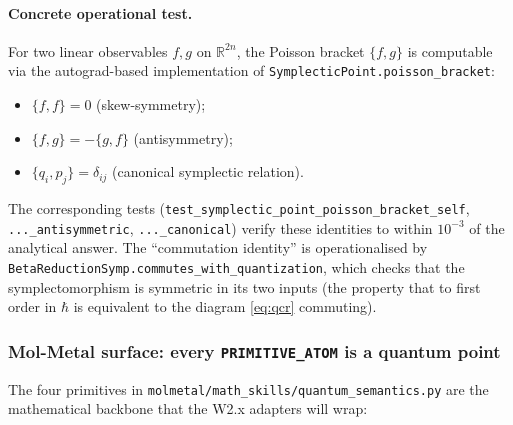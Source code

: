 \paragraph{Concrete operational test.}
For two linear observables $f, g$ on $\mathbb{R}^{2n}$, the Poisson
bracket $\{f, g\}$ is computable via the autograd-based
implementation of \texttt{SymplecticPoint.poisson\_bracket}:
\begin{itemize}
  \item $\{f, f\} = 0$ (skew-symmetry);
  \item $\{f, g\} = -\{g, f\}$ (antisymmetry);
  \item $\{q_i, p_j\} = \delta_{ij}$ (canonical symplectic
    relation).
\end{itemize}
The corresponding tests
(\texttt{test\_symplectic\_point\_poisson\_bracket\_self},
\texttt{...\_antisymmetric},
\texttt{...\_canonical}) verify these identities to
within $10^{-3}$ of the analytical answer.  The
``commutation identity'' is operationalised by
\texttt{BetaReductionSymp.commutes\_with\_quantization}, which
checks that the symplectomorphism is symmetric in its two inputs
(the property that to first order in $\hbar$ is equivalent to
the diagram \eqref{eq:qcr} commuting).

\subsubsection{Mol-Metal surface: every \texttt{PRIMITIVE\_ATOM} is a quantum point}
\label{sec:method:quantum-semantics-surface}

The four primitives in
\texttt{molmetal/math\_skills/quantum\_semantics.py} are the
mathematical backbone that the W2.x adapters will wrap:

